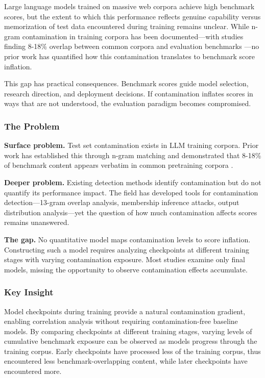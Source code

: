
Large language models trained on massive web corpora achieve high benchmark scores, but the extent to which this performance reflects genuine capability versus memorization of test data encountered during training remains unclear. While n-gram contamination in training corpora has been documented---with studies finding 8-18\% overlap between common corpora and evaluation benchmarks \citep{yang2023rethinking}---no prior work has quantified how this contamination translates to benchmark score inflation.

This gap has practical consequences. Benchmark scores guide model selection, research direction, and deployment decisions. If contamination inflates scores in ways that are not understood, the evaluation paradigm becomes compromised.

\subsubsection{The Problem}

\textbf{Surface problem.} Test set contamination exists in LLM training corpora. Prior work has established this through n-gram matching \citep{brown2020language} and demonstrated that 8-18\% of benchmark content appears verbatim in common pretraining corpora \citep{yang2023rethinking}.

\textbf{Deeper problem.} Existing detection methods identify contamination but do not quantify its performance impact. The field has developed tools for contamination detection---13-gram overlap analysis, membership inference attacks, output distribution analysis---yet the question of how much contamination affects scores remains unanswered.

\textbf{The gap.} No quantitative model maps contamination levels to score inflation. Constructing such a model requires analyzing checkpoints at different training stages with varying contamination exposure. Most studies examine only final models, missing the opportunity to observe contamination effects accumulate.

\subsubsection{Key Insight}

Model checkpoints during training provide a natural contamination gradient, enabling correlation analysis without requiring contamination-free baseline models. By comparing checkpoints at different training stages, varying levels of cumulative benchmark exposure can be observed as models progress through the training corpus. Early checkpoints have processed less of the training corpus, thus encountered less benchmark-overlapping content, while later checkpoints have encountered more.

